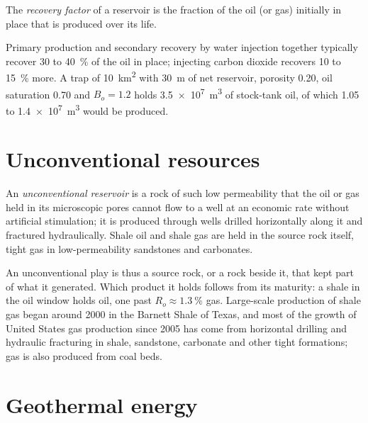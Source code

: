 \begin{definition}\label{def:b2:energy-geology:volumetrics}
The \emph{recovery factor} of a reservoir is the fraction of the oil (or gas)
initially in place that is produced over its life.
\end{definition}

Primary production and secondary recovery by water injection together typically recover 30 to \qty{40}{\percent} of the oil in place; injecting carbon
dioxide recovers 10 to \qty{15}{\percent} more. A trap of \qty{10}{km^2} with \qty{30}{m} of net
reservoir, porosity 0.20, oil saturation 0.70 and $B_o = 1.2$ holds \qty{3.5e7}{m^3} of stock-tank
oil, of which 1.05 to \qty{1.4e7}{m^3} would be produced.

\section{Unconventional resources}\label{sec:b2:energy-geology:unconventional}

\begin{definition}\label{def:b2:energy-geology:unconventional}
An \emph{unconventional reservoir} is a rock of such low
permeability that the oil or gas held in its microscopic pores cannot flow to a well at an economic
rate without artificial stimulation; it is produced through wells drilled horizontally along it and
fractured hydraulically. Shale oil and shale gas are held in the source rock itself, tight gas in
low-permeability sandstones and carbonates.
\end{definition}

An unconventional play is thus a source rock, or a rock beside it, that kept part of what it
generated. Which product it holds follows from its maturity: a shale in the oil window holds oil,
one past $R_o \approx \qty{1.3}{\percent}$ gas. Large-scale production of shale gas began around
2000 in the Barnett Shale of Texas, and most of the growth of United States gas production since
2005 has come from horizontal drilling and hydraulic fracturing in shale, sandstone, carbonate and
other tight formations; gas is also produced from coal beds.

\section{Geothermal energy}\label{sec:b2:energy-geology:geothermal}


